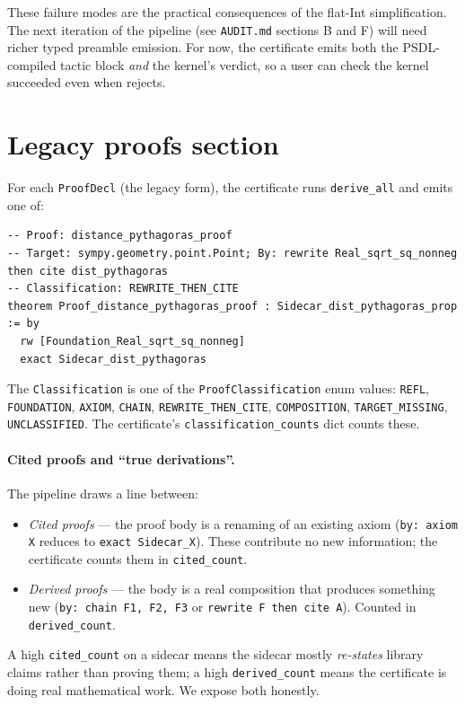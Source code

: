 These failure modes are the practical consequences of the flat-Int
simplification.  The next iteration of the pipeline (see
\texttt{AUDIT.md} sections B and F) will need richer typed
preamble emission.  For now, the certificate emits both the
PSDL-compiled tactic block \emph{and} the kernel's verdict, so a
user can check the kernel succeeded even when \Lean{} rejects.

\section{Legacy proofs section}

For each \texttt{ProofDecl} (the legacy form), the certificate runs
\texttt{derive\_all} and emits one of:

\begin{lstlisting}[language=lean4]
-- Proof: distance_pythagoras_proof
-- Target: sympy.geometry.point.Point; By: rewrite Real_sqrt_sq_nonneg then cite dist_pythagoras
-- Classification: REWRITE_THEN_CITE
theorem Proof_distance_pythagoras_proof : Sidecar_dist_pythagoras_prop := by
  rw [Foundation_Real_sqrt_sq_nonneg]
  exact Sidecar_dist_pythagoras
\end{lstlisting}

The \texttt{Classification} is one of the \texttt{ProofClassification}
enum values:
\texttt{REFL}, \texttt{FOUNDATION}, \texttt{AXIOM}, \texttt{CHAIN},
\texttt{REWRITE\_THEN\_CITE}, \texttt{COMPOSITION},
\texttt{TARGET\_MISSING}, \texttt{UNCLASSIFIED}.  The certificate's
\texttt{classification\_counts} dict counts these.

\paragraph{Cited proofs and ``true derivations''.}  The pipeline
draws a line between:
\begin{itemize}[leftmargin=1.7em]
  \item \emph{Cited proofs} --- the proof body is a renaming of an
    existing axiom (\texttt{by: axiom X} reduces to
    \texttt{exact Sidecar\_X}).  These contribute no new
    information; the certificate counts them in \texttt{cited\_count}.
  \item \emph{Derived proofs} --- the body is a real composition
    that produces something new (\texttt{by: chain F1, F2, F3} or
    \texttt{rewrite F then cite A}).  Counted in
    \texttt{derived\_count}.
\end{itemize}

A high \texttt{cited\_count} on a sidecar means the sidecar mostly
\emph{re-states} library claims rather than proving them; a high
\texttt{derived\_count} means the certificate is doing real
mathematical work.  We expose both honestly.

